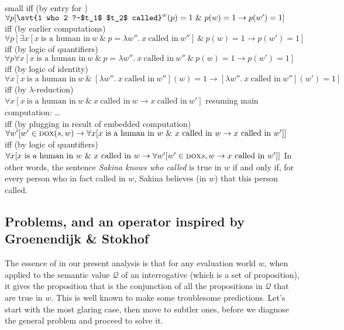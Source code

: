 {small iff (by entry for \ans)}\\
$\forall p [ \svt{1 who 2 ?-$t_1$ $t_2$ called}^{w}(p)=1\ \&\ p(w)=1 \rightarrow p(w')=1 ]$\\
{\small iff (by earlier computations)}\\
$\forall p [\exists x [x\ \text{is a human
  in}\ w\ \&\ p=\lambda w''.\ x\ \text{called
  in}\ w'']\ \&\ p(w)=1 \rightarrow p(w')=1 ]$\\
{\small iff (by logic of quantifiers)}\\
$\forall p\forall x [x\ \text{is a human
  in}\ w\ \&\ p=\lambda w''.\ x\ \text{called
  in}\ w''\ \&\ p(w)=1 \rightarrow p(w')=1 ]$\\
{\small iff (by logic of identity)}\\
$\forall x [ x\ \text{is a human in}\ w\ \&\ [\lambda w''.\ x\ \text{called
  in}\ w''](w)=1 \rightarrow [\lambda w''.\ x\ \text{called in}\ w''](w')=1]$\\
{\small iff (by $\lambda$-reduction)}\\
$\forall x [ x\ \text{is a human in}\ w\ \&\ x\ \text{called
  in}\ w \rightarrow x\ \text{called in}\ w']$ \a resuming main computation:
\dots \\
{\small iff (by plugging in result of embedded computation)}\\
$\forall w' [w'\in \textsc{dox}(s,w) \rightarrow \forall x [ x\ \text{is a human
  in}\ w\ \&\ x\ \text{called
  in}\ w \rightarrow x\ \text{called in}\ w']]$\\
{\small iff (by logic of quantifiers)}\\
$\forall x [x\ \text{is a human in}\ w\ \&\ x\ \text{called
  in}\ w \rightarrow \forall w' [w'\in \dox{s,w} \rightarrow x\ \text{called
  in}\ w']]$ \xe
%
In other words, the sentence \emph{Sakina knows who called} is true in $w$ if
and only if, for every person who in fact called in $w$, Sakina believes (in
$w$) that this person called.

\subsection{Problems, and an \ans operator inspired by Groenendijk \& Stokhof}
\label{sec:ANS-GS}

The essence of \ans in our present analysis is that for any evaluation world
$w$, when applied to the semantic value $\mathcal{Q}$ of an interrogative (which
is a set of proposition), it gives the proposition that is the conjunction of
all the propositions in $\mathcal{Q}$ that are true in $w$. This is well known
to make some troublesome predictions. Let's start with the most glaring case,
then move to subtler ones, before we diagnose the general problem and proceed to
solve it.

